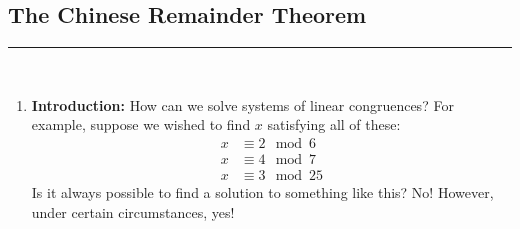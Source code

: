 \documentclass[class=article, crop=false]{standalone}
\begin{document}
\subsection{The Chinese Remainder Theorem}
\rule{\textwidth}{1pt}\\
\begin{enumerate}[1.]
	\item \textbf{Introduction:}
	How can we solve systems of linear congruences? For example,
	suppose we wished to find $x$ satisfying all of these:
	\begin{align*}
		x &\equiv 2\mod 6 \\
		x &\equiv 4\mod 7 \\
		x &\equiv 3\mod 25
	\end{align*}
	Is it always possible to find a solution to something like this? No!
	However, under certain circumstances, yes!
	

\end{enumerate}
\end{document}

